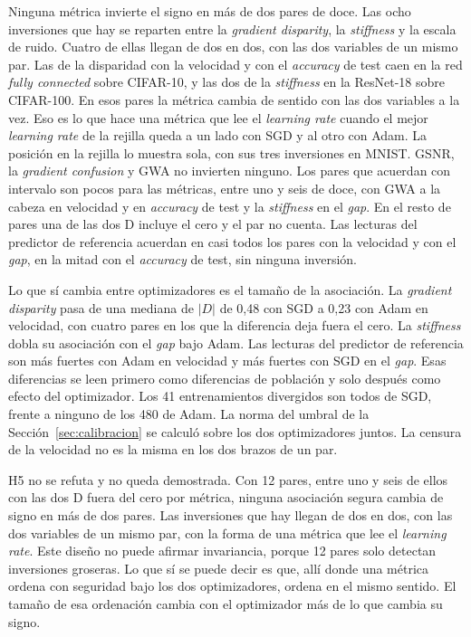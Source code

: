 Ninguna métrica invierte el signo en más de dos pares de doce. Las ocho inversiones que hay se reparten entre la \emph{gradient disparity}, la \emph{stiffness} y la escala de ruido. Cuatro de ellas llegan de dos en dos, con las dos variables de un mismo par. Las de la disparidad con la velocidad y con el \emph{accuracy} de test caen en la red \emph{fully connected} sobre CIFAR-10, y las dos de la \emph{stiffness} en la ResNet-18 sobre CIFAR-100. En esos pares la métrica cambia de sentido con las dos variables a la vez. Eso es lo que hace una métrica que lee el \emph{learning rate} cuando el mejor \emph{learning rate} de la rejilla queda a un lado con SGD y al otro con Adam. La posición en la rejilla lo muestra sola, con sus tres inversiones en MNIST. GSNR, la \emph{gradient confusion} y GWA no invierten ninguno. Los pares que acuerdan con intervalo son pocos para las métricas, entre uno y seis de doce, con GWA a la cabeza en velocidad y en \emph{accuracy} de test y la \emph{stiffness} en el \emph{gap}. En el resto de pares una de las dos D incluye el cero y el par no cuenta. Las lecturas del predictor de referencia acuerdan en casi todos los pares con la velocidad y con el \emph{gap}, en la mitad con el \emph{accuracy} de test, sin ninguna inversión.

Lo que sí cambia entre optimizadores es el tamaño de la asociación. La \emph{gradient disparity} pasa de una mediana de $|D|$ de 0,48 con SGD a 0,23 con Adam en velocidad, con cuatro pares en los que la diferencia deja fuera el cero. La \emph{stiffness} dobla su asociación con el \emph{gap} bajo Adam. Las lecturas del predictor de referencia son más fuertes con Adam en velocidad y más fuertes con SGD en el \emph{gap}. Esas diferencias se leen primero como diferencias de población y solo después como efecto del optimizador. Los 41 entrenamientos divergidos son todos de SGD, frente a ninguno de los 480 de Adam. La norma del umbral de la Sección~\ref{sec:calibracion} se calculó sobre los dos optimizadores juntos. La censura de la velocidad no es la misma en los dos brazos de un par.

H5 no se refuta y no queda demostrada. Con 12 pares, entre uno y seis de ellos con las dos D fuera del cero por métrica, ninguna asociación segura cambia de signo en más de dos pares. Las inversiones que hay llegan de dos en dos, con las dos variables de un mismo par, con la forma de una métrica que lee el \emph{learning rate}. Este diseño no puede afirmar invariancia, porque 12 pares solo detectan inversiones groseras. Lo que sí se puede decir es que, allí donde una métrica ordena con seguridad bajo los dos optimizadores, ordena en el mismo sentido. El tamaño de esa ordenación cambia con el optimizador más de lo que cambia su signo.

